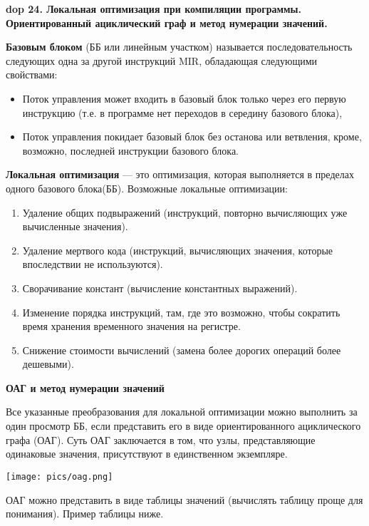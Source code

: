 \textbf{\LARGE dop 24. Локальная  оптимизация при  компиляции  программы. Ориентированный  ациклический  граф  и  метод нумерации значений.}

\textbf{Базовым блоком} (ББ или линейным участком) называется последовательность следующих одна за другой инструкций MIR, обладающая следующими свойствами:
\begin{itemize}
    \item Поток управления может входить в базовый блок только через его первую инструкцию (т.е. в программе нет переходов в середину базового блока),
    \item Поток управления покидает базовый блок без останова или ветвления, кроме, возможно, последней инструкции базового блока.
\end{itemize}

\textbf{Локальная оптимизация} --- это оптимизация, которая выполняется в пределах одного базового блока(ББ). Возможные локальные оптимизации:
\begin{enumerate}
    \item Удаление общих подвыражений (инструкций, повторно вычисляющих уже вычисленные значения).
    \item Удаление мертвого кода (инструкций, вычисляющих значения, которые впоследствии не используются).
    \item Сворачивание констант (вычисление константных выражений).
    \item Изменение порядка инструкций, там, где это возможно, чтобы сократить время хранения временного значения на регистре.
    \item Снижение стоимости вычислений (замена более дорогих операций более дешевыми).
\end{enumerate}

\textbf{ОАГ и метод нумерации значений}

Все указанные преобразования для локальной оптимизации можно выполнить за один просмотр ББ, если представить его в виде ориентированного ациклического графа (ОАГ). 
Суть ОАГ заключается в том, что узлы, представляющие одинаковые значения, присутствуют в единственном экземпляре.

\texttt{[image: pics/oag.png]}

ОАГ можно представить в виде таблицы значений (вычислять таблицу проще для понимания). Пример таблицы ниже.

